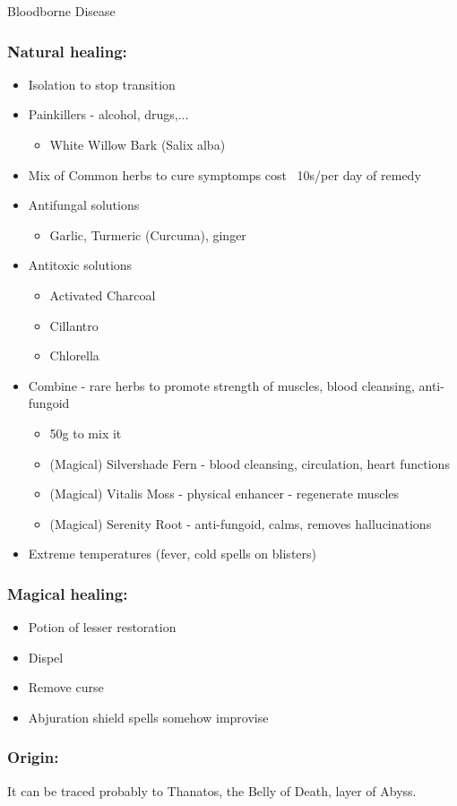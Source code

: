 \documentclass[10pt,onecolumn,twoside,openany,bg=full,layout=true]{dndbook}
\begin{document}
\begin{DndComment}{Bloodborne Disease}
\subsubsection*{Natural healing:}
\begin{itemize}
\item Isolation to stop transition
\item Painkillers - alcohol, drugs,...
\begin{itemize}
\item White Willow Bark (Salix alba)
\end{itemize}
\item Mix of Common herbs to cure symptomps cost ~10s/per day of remedy
\item Antifungal solutions
\begin{itemize}
  \item Garlic, Turmeric (Curcuma), ginger
\end{itemize}
\item Antitoxic solutions
\begin{itemize}
\item Activated Charcoal
\item Cillantro
\item Chlorella
\end{itemize}
\item Combine - rare herbs to promote strength of muscles, blood cleansing, anti-fungoid
\begin{itemize}
\item 50g to mix it
\item (Magical) Silvershade Fern - blood cleansing, circulation, heart functions
\item (Magical) Vitalis Moss - physical enhancer - regenerate muscles
\item (Magical) Serenity Root - anti-fungoid, calms, removes hallucinations
\end{itemize}
\item Extreme temperatures (fever, cold spells on blisters)
\end{itemize}

\subsubsection*{Magical healing:}
\begin{itemize}
\item Potion of lesser restoration
\item Dispel
\item Remove curse
\item Abjuration shield spells somehow improvise
\end{itemize}

\subsubsection*{Origin:}
It can be traced probably to Thanatos, the Belly of Death, layer of Abyss.

\end{DndComment}
\vfill
\newpage
\end{document}

